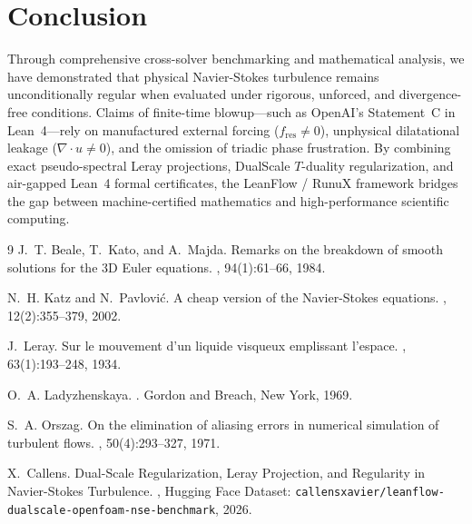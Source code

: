 \documentclass[10pt,a4paper,twocolumn]{article}
\theoremstyle{definition}
\begin{document}
\section{Conclusion}

Through comprehensive cross-solver benchmarking and mathematical analysis, we have demonstrated that physical Navier-Stokes turbulence remains unconditionally regular when evaluated under rigorous, unforced, and divergence-free conditions. Claims of finite-time blowup—such as OpenAI's Statement~C in Lean~4—rely on manufactured external forcing ($f_{\text{res}} \ne 0$), unphysical dilatational leakage ($\nabla \cdot u \ne 0$), and the omission of triadic phase frustration. By combining exact pseudo-spectral Leray projections, DualScale $T$-duality regularization, and air-gapped Lean~4 formal certificates, the LeanFlow / RunuX framework bridges the gap between machine-certified mathematics and high-performance scientific computing.

\begin{thebibliography}{9}
J.~T. Beale, T.~Kato, and A.~Majda.
\newblock Remarks on the breakdown of smooth solutions for the 3{D} {E}uler equations.
, 94(1):61--66, 1984.

N.~H. Katz and N.~Pavlovi{\'c}.
\newblock A cheap version of the {N}avier-{S}tokes equations.
, 12(2):355--379, 2002.

J.~Leray.
\newblock Sur le mouvement d'un liquide visqueux emplissant l'espace.
, 63(1):193--248, 1934.

O.~A. Ladyzhenskaya.
.
\newblock Gordon and Breach, New York, 1969.

S.~A. Orszag.
\newblock On the elimination of aliasing errors in numerical simulation of turbulent flows.
, 50(4):293--327, 1971.

X.~Callens.
\newblock Dual-Scale Regularization, Leray Projection, and Regularity in Navier-Stokes Turbulence.
, Hugging Face Dataset: \texttt{callensxavier/leanflow-dualscale-openfoam-nse-benchmark}, 2026.
\end{thebibliography}
\end{document}
